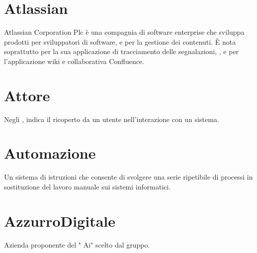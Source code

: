 \section{Atlassian}
Atlassian Corporation Plc è una compagnia di software enterprise che sviluppa prodotti per sviluppatori di software,  e per la gestione dei contenuti. È nota soprattutto per la sua applicazione di tracciamento delle segnalazioni, , e per l'applicazione wiki e collaborativa Confluence.

\section{Attore}\label{sec:Attori}
Negli , indica il  ricoperto da un utente nell'interazione con un sistema.

\section{Automazione}\label{sec:Automazioni}
Un sistema di istruzioni che consente di svolgere una serie ripetibile di processi in sostituzione del lavoro manuale sui sistemi informatici.

\section{AzzurroDigitale}
Azienda proponente del  " Ai" scelto dal gruppo.
